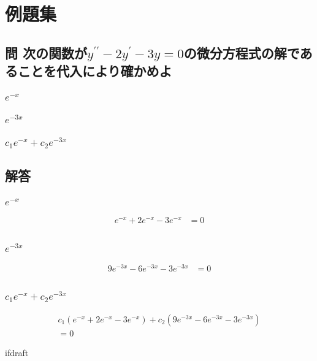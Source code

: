 \documentclass{jsarticle}
\begin{document}
    \fi


    \section{例題集}

    \subsection{問 次の関数が$y^{\prime\prime} - 2y^\prime - 3y = 0$の微分方程式の解であることを代入により確かめよ}


    \subsubsection{$e^{-x}$}

    \subsubsection{$e^{-3x}$}

    \subsubsection{$c_1 e^{-x} + c_2 e^{-3x}$}

    \subsection{解答}

    \subsubsection{$e^{-x}$}
    \begin{align}
        e^{-x} + 2e^{-x} - 3e^{-x} &= 0\\
    \end{align}

    \subsubsection{$e^{-3x}$}
    \begin{align}
        9e^{-3x} - 6e^{-3x} - 3e^{-3x} &= 0\\
    \end{align}

    \subsubsection{$c_1 e^{-x} + c_2 e^{-3x}$}
    \begin{align}
        c_1(e^{-x} + 2e^{-x} - 3e^{-x}) + c_2(9e^{-3x} - 6e^{-3x} - 3e^{-3x}) \\
        = 0
    \end{align}

    \expandafter\ifx\csname ifdraft\endcsname\relax
\end{document}
